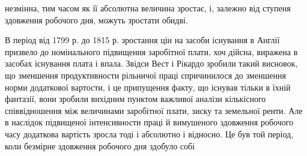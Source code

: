 \parcont{}  %
незмінна, тим часом як її абсолютна величина зростає, і, залежно
від ступеня здовження робочого дня, можуть зростати обидві.

В період від 1799 р. до 1815 р. зростання цін на засоби існування
в Англії призвело до номінального підвищення заробітної
плати, хоч дійсна, виражена в засобах існування плата і впала.
Звідси Вест і Рікардо зробили такий висновок, що зменшення
продуктивности рільничої праці спричинилося до зменшення
норми додаткової вартости, і це припущення факту, що існував
тільки в їхній фантазії, вони зробили вихідним пунктом важливої
аналізи кількісного співвідношення між величинами заробітної
плати, зиску та земельної ренти. Але в наслідок підвищеної
інтенсивности праці й вимушеного здовження робочого часу
додаткова вартість зросла тоді і абсолютно і відносно. Це був
той період, коли безмірне здовження робочого дня здобуло собі
